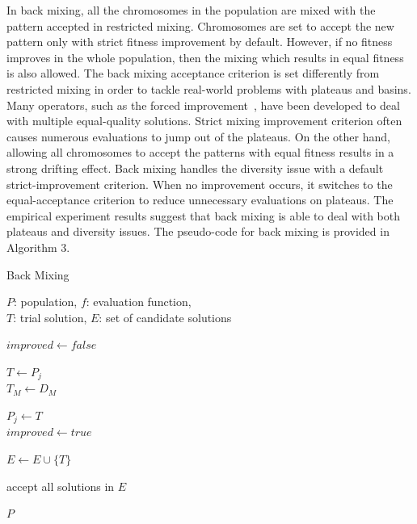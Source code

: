 \documentclass{sig-alternate-05-2015}
\begin{document}
In back mixing, all the chromosomes in the population are mixed with the pattern accepted in restricted mixing. Chromosomes are set to accept the new pattern only with strict fitness improvement by default. However, if no fitness improves in the whole population, then the mixing which results in equal fitness is also allowed. The back mixing acceptance criterion is set differently from restricted mixing in order to tackle real-world problems with plateaus and basins. Many operators, such as the forced improvement~\cite{bosman:LT-GOMEA}, have been developed to deal with multiple equal-quality solutions. Strict mixing improvement criterion often causes numerous evaluations to jump out of the plateaus. On the other hand, allowing all chromosomes to accept the patterns with equal fitness results in a strong drifting effect. Back mixing handles the diversity issue with a default strict-improvement criterion. When no improvement occurs, it switches to the equal-acceptance criterion to reduce unnecessary evaluations on plateaus. The empirical experiment results suggest that back mixing is able to deal with both plateaus and diversity issues. The pseudo-code for back mixing is provided in Algorithm 3. 

\begin{algorithm}
\caption{Back Mixing}\label{algo_disjdecomp}

$P$: population, $f$: evaluation function, \\
$T$: trial solution, $E$: set of candidate solutions 


\BlankLine

$improved  \leftarrow false$ \\
 {

    $T \leftarrow P_j$ \\
    $T_M \leftarrow D_M$ \\

     {

        $P_j \leftarrow T$ \\
        $improved  \leftarrow true$ \\
    }{
         {
            $E \leftarrow E \cup \{T\}$ \\
        }
    }
}
 {
    accept all solutions in $E$ \\
} 

\Return $P$

\end{algorithm} 
\end{document}
